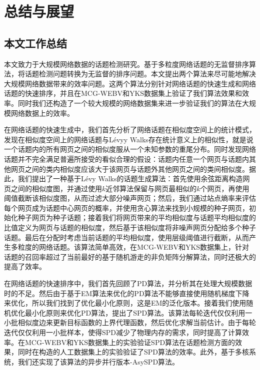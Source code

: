 \chapter{总结与展望}\label{chap:ConclusionProspect}

\section{本文工作总结}

本文致力于大规模网络数据的话题检测研究。基于多粒度网络话题的无监督排序算法，将话题检测问题转换为无监督的排序问题。本文提出两个算法来尽可能地解决大规模网络数据带来的效率问题。这两个算法分别针对网络话题的快速生成和网络话题的快速排序，并且在MCG-WEBV和YKS数据集上验证了我们算法效果和效率。同时我们还构造了一个较大规模的网络数据集来进一步验证我们的算法在大规模网络数据上的效率。

在网络话题的快速生成中，我们首先分析了网络话题在相似度空间上的统计模式，发现在相似度空间上的网络话题与L\'evyy Walks存在统计意义上的相似性，就是说一个话题内的所有网页之间的相似度服从一个未知参数的重尾分布。同时发现网络话题并不完全满足普遍所接受的看似合理的假设：话题内任意一个网页与话题内其他网页之间的类内相似度应该大于该网页与话题外其他网页之间的类间相似度。据此，我们提出了一种基于L\'evy Walks的话题生成算法：首先使用余弦距离构造网页之间的相似度图，并通过使用$k$近邻算法保留与网页最相似的$k$个网页，再使用阈值截断该相似度图，从而过滤大部分噪声网页；然后，我们通过站点熵率来评估每个网页成为话题中心网页的概率，并使用贪心算法来找到小规模的种子网页，初始化种子网页为种子话题；接着我们将网页带来的平均相似度与话题平均相似度的比值定义为网页与话题的相似度，然后基于该相似度将非噪声网页分配给多个种子话题。最后在分配时考虑当前话题的平均相似度，使用层级阈值进行截断，从而产生多粒度的网络话题。该算法简单高效，在MCG-WEBV和YKS数据集上，针对话题的召回率超过了当前最好的基于随机游走的非负矩阵分解算法，同时还极大的提高了效率。

在网络话题的快速排序中，我们首先回顾了PD算法，并分析其在处理大规模数据时的不足。然后由于基于EM算法来优化的PD算法不能够直接使用随机梯度下降来优化，所以我们找到了优化最小化原则，这是EM的泛化版本。接着我们使用随机优化最小化原则来优化PD算法，提出了SPD算法。该算法每轮迭代仅仅利用一小批相似度边来更新目标函数的上界代理函数，然后优化求解当前估计。由于每轮迭代仅仅利用一小批样本，使得SPD减少了物理内存的需求，同时提高了计算效率。在MCG-WEBV和YKS数据集上的实验验证SPD算法在话题检测方面的效果，同时在构造的人工数据集上的实验验证了SPD算法的效率。此外，基于多核系统，我们还实现了该算法的异步并行版本-AsySPD算法。



